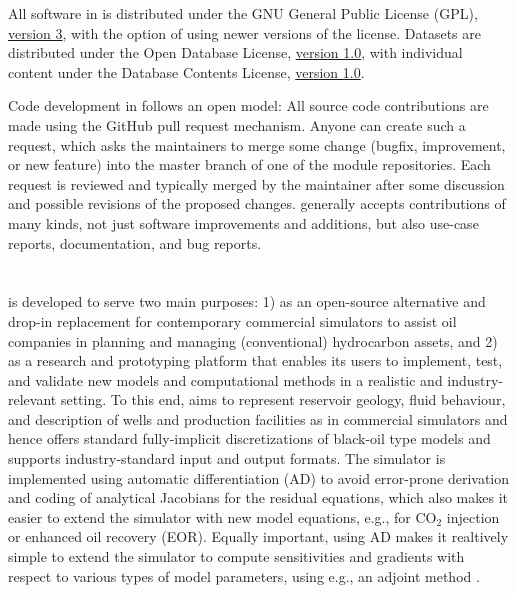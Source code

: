 All software in \opm is distributed under the GNU General Public License (GPL),
\href{http://www.gnu.org/licenses/gpl-3.0.en.html}{version 3}, with the option of using
newer versions of the license. Datasets are distributed under the Open Database License,
\href{http://opendatacommons.org/licenses/odbl/1.0/}{version 1.0}, with individual content
under the Database Contents License,
\href{http://opendatacommons.org/licenses/dbcl/1.0/}{version 1.0}.


Code development in \opm follows an open model: All source code
contributions are made using the GitHub pull request
mechanism. Anyone can create such a request, which asks the
maintainers to merge some change (bugfix, improvement, or new feature)
into the master branch of one of the module
repositories. Each request is reviewed and typically merged by
the maintainer after some discussion and possible revisions of the
proposed changes. \opm generally
accepts contributions of many kinds, not just software improvements
and additions, but also use-case reports, documentation, and bug
reports.


\section{\opmflow} \label{sec:flow}


\opmflow is developed to serve two main
purposes: 1) as an open-source alternative and
drop-in replacement for contemporary commercial simulators to assist
oil companies in planning and managing (conventional) hydrocarbon
assets, and 2) as a research and prototyping platform
that enables its users to implement, test, and validate new models and
computational methods in a realistic and industry-relevant
setting.  To this end, \opmflow aims to represent
reservoir geology, fluid behaviour, and description of wells and
production facilities  as in commercial simulators and
hence offers standard
fully-implicit discretizations of black-oil type models and supports
industry-standard input and output formats. The simulator is implemented using
automatic differentiation (AD) \cite{Neidinger2010} to avoid error-prone derivation and
coding of analytical Jacobians for the residual equations, which also
makes it easier to extend the simulator with new model equations, e.g.,
for CO$_2$ injection or enhanced oil recovery (EOR).
Equally important, using AD makes it realtively simple to extend the simulator to compute
sensitivities and gradients with respect to various types of model parameters, using e.g.,
an adjoint method \cite{Jansen:adjoints}.

